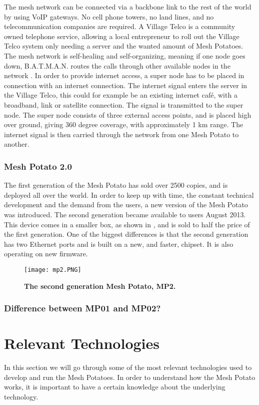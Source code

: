The mesh network can be connected via a backbone link to the rest of the world by using VoIP gateways. No cell phone towers, no land lines, and no telecommunication companies are required. A Village Telco is a community owned telephone service, allowing a local entrepreneur to roll out the Village Telco system only needing a server and the wanted amount of Mesh Potatoes. The mesh network is self-healing and self-organizing, meaning if one node goes down, B.A.T.M.A.N. routes the calls through other available nodes in the network \cite{MPbyRowe}. In order to provide internet access, a super node has to be placed in connection with an internet connection. The internet signal enters the server in the Village Telco, this could for example be an existing internet café, with a broadband, link or satellite connection. The signal is transmitted to the super node. The super node consists of three external access points, and is placed high over ground, giving 360 degree coverage, with approximately 1 km range. The internet signal is then carried through the network from one Mesh Potato to another. 


\subsubsection{Mesh Potato 2.0}
The first generation of the Mesh Potato has sold over 2500 copies, and is deployed all over the world. In order to keep up with time, the constant technical development and the demand from the users, a new version of the Mesh Potato was introduced. The second generation became available to users August 2013. This device comes in a smaller box, as shown in , and is sold to half the price of the first generation. One of the biggest differences is that the second generation has two Ethernet ports and is built on a new, and faster, chipset. It is also  operating on new firmware.

\begin{figure}[h!]
  \centering
      \texttt{[image: mp2.PNG]}
  \caption [MP2]{\textbf{The second generation Mesh Potato, MP2.}}
  \label{fig:MP02}
\end{figure}

\subsubsection{Difference between MP01 and MP02?}


\section{Relevant Technologies}
In this section we will go through some of the most relevant technologies used to develop and run the Mesh Potatoes. In order to understand how the Mesh Potato works, it is important to have a certain knowledge about the underlying technology. 

